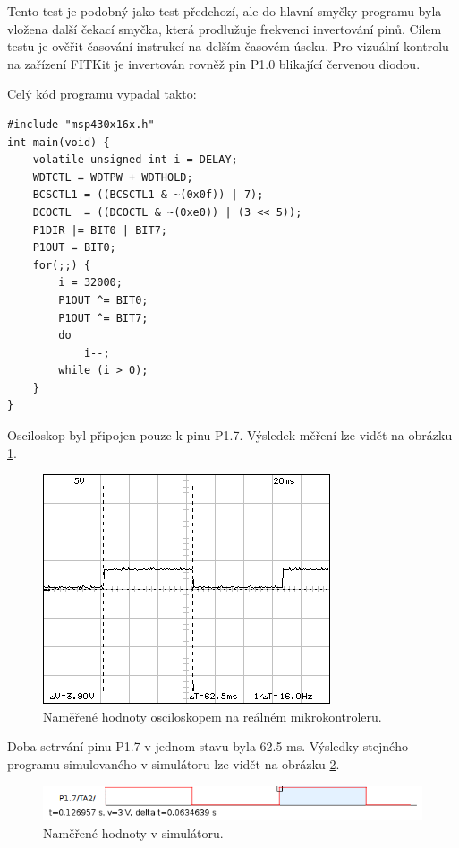 Tento test je podobný jako test předchozí, ale do hlavní smyčky programu byla vložena další čekací smyčka, která prodlužuje frekvenci invertování pinů. Cílem testu je ověřit časování instrukcí na delším časovém úseku. Pro vizuální kontrolu na zařízení FITKit je invertován rovněž pin P1.0 blikající červenou diodou.

Celý kód programu vypadal takto:

\lstset{language=XML, numbers=left, frame=single, breaklines=true, tabsize=2, xleftmargin=20pt}
\begin{lstlisting}
#include "msp430x16x.h"
int main(void) {
	volatile unsigned int i = DELAY;
	WDTCTL = WDTPW + WDTHOLD;
	BCSCTL1 = ((BCSCTL1 & ~(0x0f)) | 7);
	DCOCTL  = ((DCOCTL & ~(0xe0)) | (3 << 5));
	P1DIR |= BIT0 | BIT7;
	P1OUT = BIT0;
	for(;;) {
		i = 32000;
		P1OUT ^= BIT0;
		P1OUT ^= BIT7;
		do
			i--;
		while (i > 0);
	}
}
\end{lstlisting}

Osciloskop byl připojen pouze k pinu P1.7. Výsledek měření lze vidět na obrázku \ref{fig:dso05osc}.

\begin{figure}[ht]
\centering
\includegraphics[trim=0cm 0cm 0cm 0cm]{fig/dso05}
\caption{Naměřené hodnoty osciloskopem na reálném mikrokontroleru.}
\label{fig:dso05osc}
\end{figure}

Doba setrvání pinu P1.7 v jednom stavu byla 62.5 ms. Výsledky stejného programu simulovaného v simulátoru lze vidět na obrázku \ref{fig:dso05sim}.

\begin{figure}[ht]
\centering
\includegraphics[trim=0cm 0cm 0cm 0cm, scale=0.8]{fig/dso05sim}
\caption{Naměřené hodnoty v simulátoru.}
\label{fig:dso05sim}
\end{figure}

